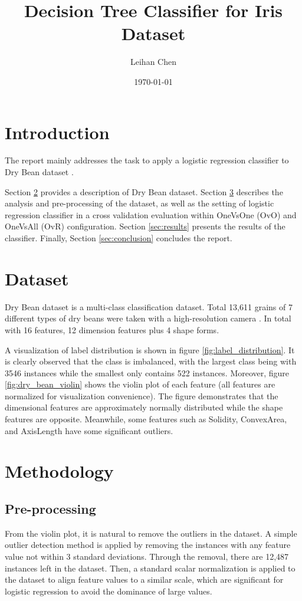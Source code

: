 \documentclass[12pt,a4paper]{article}
\title{Decision Tree Classifier for Iris Dataset}
\author{Leihan Chen}
\date{\today}
\begin{document}

\section{Introduction}
The report mainly addresses the task to apply a logistic regression classifier \cite{scikit-learn_LogisticRegression} to Dry Bean dataset \cite{dry_bean_602}. 

Section \ref{sec:dataset} provides a description of Dry Bean dataset. 
Section \ref{sec:methodology} describes the analysis and pre-processing of the dataset, 
as well as the setting of logistic regression classifier in a cross validation evaluation within OneVsOne (OvO) and OneVsAll (OvR) configuration. 
Section \ref{sec:results} presents the results of the classifier. Finally, Section \ref{sec:conclusion} concludes the report. 


\section{Dataset}\label{sec:dataset}
Dry Bean dataset is a multi-class classification dataset. Total 13,611 grains of 7 different types of dry beans were taken with a high-resolution camera \cite{dry_bean_602}. In total with 16 features, 12 dimension features plus 4 shape forms. 

A visualization of label distribution is shown in figure \ref{fig:label_distribution}. It is clearly observed that the class is imbalanced, with the largest class being with 3546 instances while the smallest only contains 522 instances.
Moreover, figure \ref{fig:dry_bean_violin} shows the violin plot of each feature (all features are normalized for visualization convenience). 
The figure demonstrates that the dimensional features are approximately normally distributed while the shape features are opposite. Meanwhile, some features such as Solidity, ConvexArea, and AxisLength have some significant outliers.

\section{Methodology}\label{sec:methodology}
\subsection{Pre-processing}\label{subsec:preprocessing}
From the violin plot, it is natural to remove the outliers in the dataset. A simple outlier detection method is applied by removing the instances with any feature value not within 3 standard deviations.
Through the removal, there are 12,487 instances left in the dataset. Then, a standard scalar normalization is applied to the dataset to align feature values to a similar scale, which are significant for logistic regression to avoid the dominance of large values.
\end{document}
